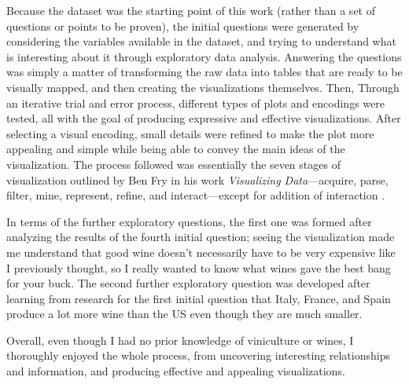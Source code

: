 Because the dataset was the starting point of this work (rather than a set of questions or points to be proven), the initial questions were generated by considering the variables available in the dataset, and trying to understand what is interesting about it through exploratory data analysis. Answering the questions was simply a matter of transforming the raw data into tables that are ready to be visually mapped, and then creating the visualizations themselves. Then, Through an iterative trial and error process, different types of plots and encodings were tested, all with the goal of producing expressive and effective visualizations. After selecting a visual encoding, small details were refined to make the plot more appealing and simple while being able to convey the main ideas of the visualization. The process followed was essentially the seven stages of visualization outlined by Ben Fry in his work \emph{Visualizing Data}---acquire, parse, filter, mine, represent, refine, and interact---except for addition of interaction \cite{Fry}.

In terms of the further exploratory questions, the first one was formed after analyzing the results of the fourth initial question; seeing the visualization made me understand that good wine doesn't necessarily have to be very expensive like I previously thought, so I really wanted to know what wines gave the best bang for your buck. The second further exploratory question was developed after learning from research for the first initial question that Italy, France, and Spain produce a lot more wine than the US even though they are much smaller.

Overall, even though I had no prior knowledge of viniculture or wines, I thoroughly enjoyed the whole process, from uncovering interesting relationships and information, and producing effective and appealing visualizations.
    
\printbibliography